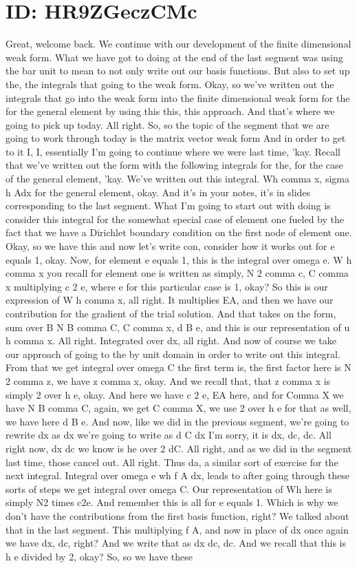 \documentclass[10pt]{article}
\begin{document}
\section*{ID: HR9ZGeczCMc}
Great, welcome back. We continue with our development of the finite dimensional weak form. What we have got to doing at the end of the last segment was using the bar unit to mean to not only write out our basis functions. But also to set up the, the integrals that going to the weak form. Okay, so we've written out the integrals that go into the weak form into the finite dimensional weak form for the for the general element by using this this, this approach. And that's where we going to pick up today. All right. So, so the topic of the segment that we are going to work through today is the matrix vector weak form And in order to get to it I, I, essentially I'm going to continue where we were last time, 'kay. Recall that we've written out the form with the following integrals for the, for the case of the general element, 'kay. We've written out this integral. Wh comma x, sigma h Adx for the general element, okay. And it's in your notes, it's in slides corresponding to the last segment. What I'm going to start out with doing is consider this integral for the somewhat special case of element one fueled by the fact that we have a Dirichlet boundary condition on the first node of element one. Okay, so we have this and now let's write con, consider how it works out for e equals 1, okay. Now, for element e equals 1, this is the integral over omega e. W h comma x you recall for element one is written as simply, N 2 comma c, C comma x multiplying c 2 e, where e for this particular case is 1, okay? So this is our expression of W h comma x, all right. It multiplies EA, and then we have our contribution for the gradient of the trial solution. And that takes on the form, sum over B N B comma C, C comma x, d B e, and this is our representation of u h comma x. All right. Integrated over dx, all right. And now of course we take our approach of going to the by unit domain in order to write out this integral. From that we get integral over omega C the first term is, the first factor here is N 2 comma z, we have z comma x, okay. And we recall that, that z comma x is simply 2 over h e, okay. And here we have c 2 e, EA here, and for Comma X we have N B comma C, again, we get C comma X, we use 2 over h e for that as well, we have here d B e. And now, like we did in the previous segment, we're going to rewrite dx as dx we're going to write as d C dx I'm sorry, it is dx, dc, dc. All right now, dx dc we know is he over 2 dC. All right, and as we did in the segment last time, those cancel out. All right. Thus da, a similar sort of exercise for the next integral. Integral over omega e wh f A dx, leads to after going through these sorts of steps we get integral over omega C. Our representation of Wh here is simply N2 times c2e. And remember this is all for e equals 1. Which is why we don't have the contributions from the first basis function, right? We talked about that in the last segment. This multiplying f A, and now in place of dx once again we have dx, dc, right? And we write that as dx dc, dc. And we recall that this is h e divided by 2, okay? So, so we have these 
\end{document}
